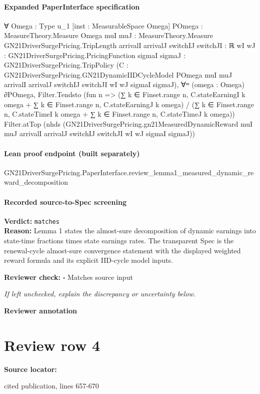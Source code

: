 \documentclass[10pt]{article}
\newcommand{\reviewerbox}{%
  \par\noindent\fbox{\parbox{0.96\linewidth}{\rule{0pt}{0.38in}}}\par
}
\newcommand{\reviewmatch}[1]{%
  \par\noindent\textbf{Reviewer check:} $\square$\; #1\par
  \noindent\emph{If left unchecked, explain the discrepancy or uncertainty below.}\par
}
\begin{document}
\paragraph{Expanded PaperInterface specification}
\begin{ReviewVerbatim}
∀ {Omega : Type u_1} [inst : MeasurableSpace Omega] {POmega : MeasureTheory.Measure Omega}
  {muI muJ : MeasureTheory.Measure GN21DriverSurgePricing.TripLength} {arrivalI arrivalJ switchIJ switchJI : ℝ}
  {wI wJ : GN21DriverSurgePricing.PricingFunction} {sigmaI sigmaJ : GN21DriverSurgePricing.TripPolicy}
  (C :
    GN21DriverSurgePricing.GN21DynamicIIDCycleModel POmega muI muJ arrivalI arrivalJ switchIJ switchJI wI wJ sigmaI
      sigmaJ),
  ∀ᵐ (omega : Omega) ∂POmega,
    Filter.Tendsto
      (fun n =>
        (∑ k ∈ Finset.range n, C.stateEarningI k omega + ∑ k ∈ Finset.range n, C.stateEarningJ k omega) /
          (∑ k ∈ Finset.range n, C.stateTimeI k omega + ∑ k ∈ Finset.range n, C.stateTimeJ k omega))
      Filter.atTop
      (nhds
        (GN21DriverSurgePricing.gn21MeasuredDynamicReward muI muJ arrivalI arrivalJ switchIJ switchJI wI wJ sigmaI
          sigmaJ))
\end{ReviewVerbatim}

\paragraph{Lean proof endpoint (built separately)}\begin{ReviewVerbatim}
GN21DriverSurgePricing.PaperInterface.review_lemma1_measured_dynamic_reward_decomposition
\end{ReviewVerbatim}

\paragraph{Recorded source-to-Spec screening}
\textbf{Verdict:} \texttt{matches}
\\
\textbf{Reason:} Lemma 1 states the almost-sure decomposition of dynamic earnings into state-time fractions times state earnings rates. The transparent Spec is the renewal-cycle almost-sure convergence statement with the displayed weighted reward formula and its explicit IID-cycle model inputs.
\reviewmatch{Matches source input}
\noindent\textbf{Reviewer annotation}\par
\reviewerbox
\clearpage
\hypertarget{source-claim-dbe4c990fc185239}{}
\section*{Review row 4}
\textbf{Source locator:} {\footnotesize\raggedright cited publication, lines 657-\allowbreak{}670\par}
\end{document}
